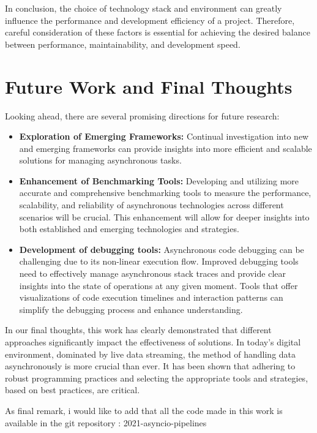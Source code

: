 In conclusion, the choice of technology stack and environment can greatly influence the performance and development efficiency of a project. Therefore, careful consideration of these factors is essential for achieving the desired balance between performance, maintainability, and development speed.


\section{Future Work and Final Thoughts}

Looking ahead, there are several promising directions for future research:

\begin{itemize}
    \item \textbf{Exploration of Emerging Frameworks:} Continual investigation into new and emerging frameworks can provide insights into more efficient and scalable solutions for managing asynchronous tasks.
    \item \textbf{Enhancement of Benchmarking Tools:} Developing and utilizing more accurate and comprehensive benchmarking tools to measure the performance, scalability, and reliability of asynchronous technologies across different scenarios will be crucial. This enhancement will allow for deeper insights into both established and emerging technologies and strategies.
    \item \textbf{Development of debugging tools:} Asynchronous code debugging can be challenging due to its non-linear execution flow. Improved debugging tools need to effectively manage asynchronous stack traces and provide clear insights into the state of operations at any given moment. Tools that offer visualizations of code execution timelines and interaction patterns can simplify the debugging process and enhance understanding.
\end{itemize}

In our final thoughts, this work has clearly demonstrated that different approaches significantly impact the effectiveness of solutions. In today's digital environment, dominated by live data streaming, the method of handling data asynchronously is more crucial than ever. It has been shown that adhering to robust programming practices and selecting the appropriate tools and strategies, based on best practices, are critical.

As final remark, i would like to add that all the code made in this work is available in the git repository : 2021-asyncio-pipelines \cite{tese}



